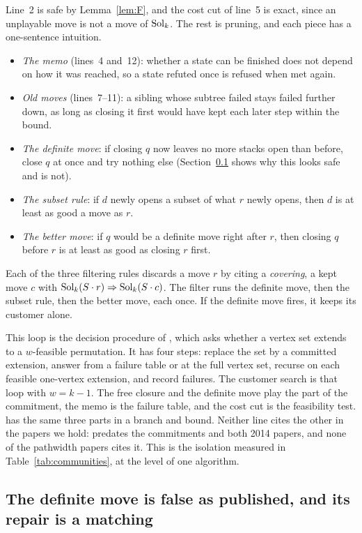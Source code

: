 Line~2 is safe by Lemma~\ref{lem:F}, and the cost cut of line~5 is exact,
since an unplayable move is not a move of $\mathrm{Sol}_k$. The rest is pruning, and
each piece has a one-sentence intuition.
\begin{itemize}
\item \emph{The memo} (lines~4 and~12): whether a state can be finished does
  not depend on how it was reached, so a state refuted once is refused when
  met again.
\item \emph{Old moves} (lines~7--11): a sibling whose subtree failed stays
  failed further down, as long as closing it first would have kept each later
  step within the bound.
\item \emph{The definite move}: if closing $q$ now leaves no more stacks open
  than before, close $q$ at once and try nothing else
  (Section~\ref{sec:definite} shows why this looks safe and is not).
\item \emph{The subset rule}: if $d$ newly opens a subset of what $r$ newly
  opens, then $d$ is at least as good a move as $r$.
\item \emph{The better move}: if $q$ would be a definite move right after $r$,
  then closing $q$ before $r$ is at least as good as closing $r$ first.
\end{itemize}
Each of the three filtering rules discards a move $r$ by citing a
\emph{covering}, a kept move $c$ with
$\mathrm{Sol}_k(S\cdot r)\Rightarrow\mathrm{Sol}_k(S\cdot c)$. The filter runs the definite
move, then the subset rule, then the better move, each once. If the definite
move fires, it keeps its customer alone.

This loop is the decision procedure of \citet[Algorithm~1,
p.~393]{KobayashiKomuroTamaki2014}, which asks whether a vertex set extends to
a $w$-feasible permutation. It has four steps: replace the set by a committed extension, answer
from a failure table or at the full vertex set, recurse on each feasible
one-vertex extension, and record failures. The customer search is that loop
with $w=k-1$. The free closure and the definite move play the part of the
commitment, the memo is the failure table, and the cost cut is the feasibility
test. \citet[\S3.2]{CoudertMazauricNisse2014} has the same three parts in a
branch and bound. Neither line cites the other in the papers we hold:
\citet{ChuStuckey2009} predates the commitments and both 2014 papers, and none
of the pathwidth papers cites it. This is the isolation measured in
Table~\ref{tab:communities}, at the level of one algorithm.

\subsection{The definite move is false as published, and its repair is a matching}
\label{sec:definite}

